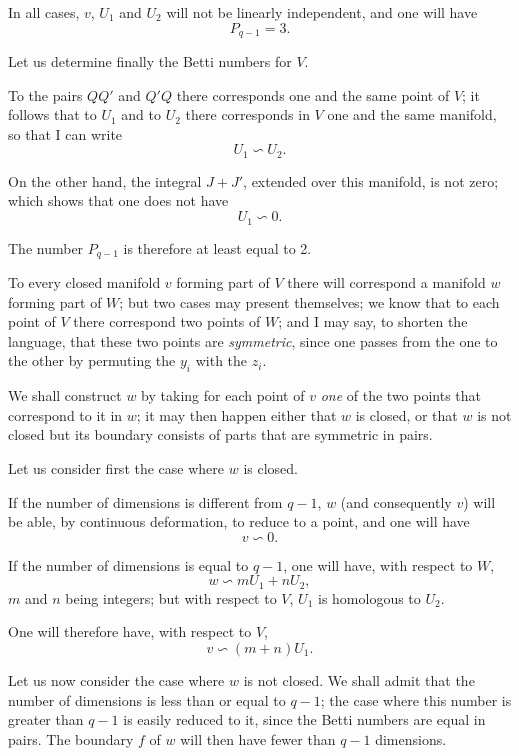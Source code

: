 \documentclass{article}
\begin{document}
In all cases, $v$, $U_{1}$ and $U_{2}$ will not be linearly independent, and one will have
\[ P_{q-1} = 3. \]

Let us determine finally the Betti numbers for $V$.

To the pairs $QQ'$ and $Q'Q$ there corresponds one and the same point of $V$; it
follows that to $U_{1}$ and to $U_{2}$ there corresponds in $V$ one and the same manifold, so that I can write
\[ U_{1} \backsim U_{2}. \]

On the other hand, the integral $J + J'$, extended over this manifold, is not zero; which shows that one does not have
\[ U_{1} \backsim 0. \]

The number $P_{q-1}$ is therefore at least equal to 2.

To every closed manifold $v$ forming part of $V$ there will correspond a manifold $w$ forming part of $W$; but two cases may present themselves; we know that to each point of $V$ there correspond two points of $W$; and I may say, to shorten the language, that these two points are \emph{symmetric}, since one passes from the one to the other by permuting the $y_{i}$ with the $z_{i}$.

We shall construct $w$ by taking for each point of $v$ \emph{one} of the two points that correspond to it in $w$; it may then happen either that $w$ is closed, or that $w$ is not closed but its boundary consists of parts that are symmetric in pairs.

Let us consider first the case where $w$ is closed.

If the number of dimensions is different from $q - 1$, $w$ (and consequently $v$) will be able, by continuous deformation, to reduce to a point, and one will have
\[ v \backsim 0. \]

If the number of dimensions is equal to $q - 1$, one will have, with respect to $W$,
\[ w \backsim mU_{1} + nU_{2}, \]
$m$ and $n$ being integers; but with respect to $V$, $U_{1}$ is homologous to $U_{2}$.

One will therefore have, with respect to $V$,
\[ v \backsim (m + n)U_{1}. \]

Let us now consider the case where $w$ is not closed. We shall admit
that the number of dimensions is less than or equal to $q - 1$; the case where this number is greater than $q - 1$ is easily reduced to it, since the Betti numbers are equal in pairs. The boundary $f$ of $w$ will then have fewer than $q - 1$ dimensions.
\end{document}

